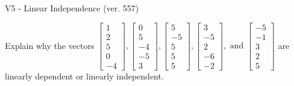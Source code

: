 \begin{exercise}
  \begin{exerciseTitle}V5 - Linear Independence (ver. 557)\end{exerciseTitle}
  \begin{exerciseStatement}
    Explain why the vectors \(\left[\begin{array}{r}
1 \\
2 \\
5 \\
0 \\
-4
\end{array}\right] , \left[\begin{array}{r}
0 \\
5 \\
-4 \\
-5 \\
3
\end{array}\right] , \left[\begin{array}{r}
5 \\
-5 \\
5 \\
5 \\
5
\end{array}\right] , \left[\begin{array}{r}
3 \\
-5 \\
2 \\
-6 \\
-2
\end{array}\right] , \text{ and } \left[\begin{array}{r}
-5 \\
-1 \\
3 \\
2 \\
5
\end{array}\right]\) are linearly dependent or linearly independent.	



\end{exerciseStatement}
\end{exercise}

